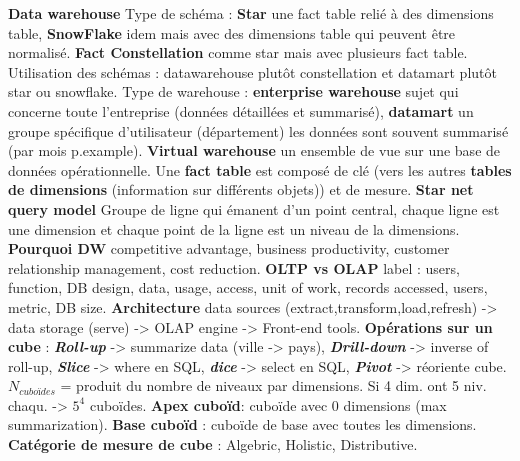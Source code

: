 \documentclass[9pt,a4paper]{report}
\begin{document}
\textbf{Data warehouse} Type de schéma : \textbf{Star} une fact table relié à des dimensions table, \textbf{SnowFlake} idem mais avec des dimensions table qui peuvent être normalisé. \textbf{ Fact Constellation} comme star mais avec plusieurs fact table. Utilisation des schémas : datawarehouse plutôt constellation et datamart plutôt star ou snowflake. Type de warehouse : \textbf{enterprise warehouse} sujet qui concerne toute l'entreprise (données détaillées et summarisé), \textbf{datamart} un groupe spécifique d'utilisateur (département) les données sont souvent summarisé (par mois p.example). \textbf{Virtual warehouse} un ensemble de vue sur une base de données opérationnelle. Une \textbf{fact table} est composé de clé (vers les autres \textbf{tables de dimensions} (information sur différents objets)) et de mesure. \textbf{Star net query model} Groupe de ligne qui émanent d'un point central, chaque ligne est une dimension et chaque point de la ligne est un niveau de la dimensions. \textbf{Pourquoi DW} competitive advantage, business productivity, customer relationship management, cost reduction. \textbf{OLTP vs OLAP} label : users, function, DB design, data, usage, access, unit of work, records accessed, users, metric, DB size. \textbf{Architecture} data sources (extract,transform,load,refresh) -> data storage (serve) -> OLAP engine -> Front-end tools. \textbf{Opérations sur un cube} : \textit{\textbf{Roll-up}} -> summarize data (ville -> pays), \textit{\textbf{Drill-down}} -> inverse of roll-up, \textit{\textbf{Slice}} -> where en SQL, \textit{\textbf{dice}} -> select en SQL, \textit{\textbf{Pivot}} -> réoriente cube. \textbf{$N_{cuboïdes}$} = produit du nombre de niveaux par dimensions. Si 4 dim. ont 5 niv. chaqu. -> $5^4$ cuboïdes. \textbf{Apex cuboïd}: cuboïde avec $0$ dimensions (max summarization). \textbf{Base cuboïd} : cuboïde de base avec toutes les dimensions. \textbf{Catégorie de mesure de cube} : Algebric, Holistic, Distributive.
\end{document}
